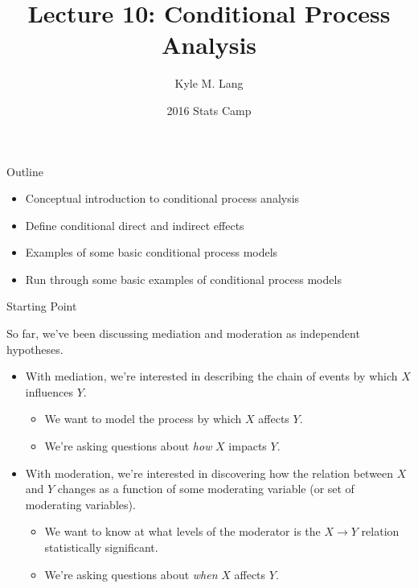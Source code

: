 \documentclass{beamer}
\title[Lecture 10]{Lecture 10: Conditional Process Analysis}
\author{Kyle M. Lang}
\institute[TTU IMMAP]{
  Institute for Measurement, Methodology, Analysis \& Policy\\
  Texas Tech University\\
  Lubbock, TX
}
\date{2016 Stats Camp}
\newcommand{\va}[0]{\vspace{12pt}}
\newcommand{\vb}[0]{\vspace{6pt}}
\newcommand{\vc}[0]{\vspace{3pt}}
\begin{document}




\begin{frame}[plain]
  
  \titlepage
  
\end{frame}


\begin{frame}{Outline}

  \begin{itemize}
  \item Conceptual introduction to conditional process analysis
    \va
  \item Define conditional direct and indirect effects
    \va
  \item Examples of some basic conditional process models
    \va
  \item Run through some basic examples of conditional process models
  \end{itemize}
  
\end{frame}



\begin{frame}{Starting Point}
  
  So far, we've been discussing mediation and moderation as
  independent hypotheses.  
  \va
  \begin{itemize}
    \item With mediation, we're interested in describing the chain of
      events by which $X$ influences $Y$.
      \vb
      \begin{itemize}
      \item We want to model the process by which $X$ affects $Y$.
        \vc
      \item We're asking questions about \emph{how} $X$ impacts $Y$.
      \end{itemize}
      \vb
    \item With moderation, we're interested in discovering how the
      relation between $X$ and $Y$ changes as a function of some
      moderating variable (or set of moderating variables).  
      \vb
      \begin{itemize}
      \item We want to know at what levels of the moderator is the $X
        \rightarrow Y$ relation statistically significant.
        \vc
      \item We're asking questions about \emph{when} $X$ affects $Y$.
      \end{itemize}
  \end{itemize}
  
\end{frame}
\end{document}
